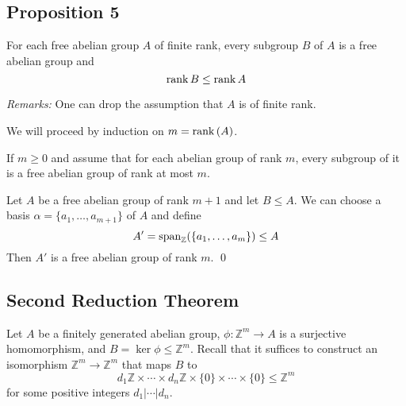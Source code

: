 \documentclass{article}
\renewenvironment{proof}{{\bfseries\color{blue1} Proof:}}{\qed}
\begin{document}
\subsection{Proposition 5}
\begin{idea}
    For each free abelian group $A$ of finite rank, every subgroup $B$ of $A$ is a free abelian group and
    \begin{equation}
        \mathrm{rank}\,B \le \mathrm{rank}\,A
    \end{equation}
\end{idea}
\textit{Remarks:} One can drop the assumption that $A$ is of finite rank.

\begin{proof}
    We will proceed by induction on $m=\mathrm{rank}\,(A)$.

    If $m \ge 0$ and assume that for each abelian group of rank $m$, every subgroup of it is a free abelian group of rank at most $m$.

    Let $A$ be a free abelian group of rank $m+1$ and let $B \le A$. We can choose a basis $\alpha=\{a_1,\dots,a_{m+1}\}$ of $A$ and define
    \begin{equation}
        A' = \mathrm{span}_{\mathbb{Z}}(\{a_1,\dots,a_m\}) \le A
    \end{equation}
    Then $A'$ is a free abelian group of rank $m$.
\end{proof}
\subsection{Second Reduction Theorem}
Let $A$ be a finitely generated abelian group, $\phi: \mathbb{Z}^m \rightarrow A$ is a surjective homomorphism, and $B=\ker\phi \le \mathbb{Z}^m$. Recall that it suffices to construct an isomorphism $\mathbb{Z}^m \rightarrow \mathbb{Z}^m$ that maps $B$ to $$d_1\mathbb{Z} \times \cdots \times d_n\mathbb{Z} \times \{0\} \times \cdots \times \{0\} \le \mathbb{Z}^m$$
for some positive integers $d_1|\cdots | d_n$.
\end{document}
